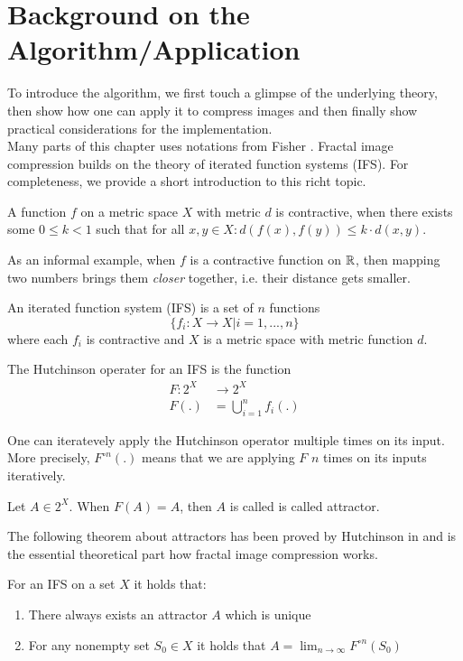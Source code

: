 \section{Background on the Algorithm/Application}\label{sec:background}
To introduce the algorithm, we first touch a glimpse of the underlying theory, then show how one can apply
it to compress images and then finally show practical considerations for the implementation. \\
Many parts of this chapter uses notations from Fisher \cite{fisher2012}.
Fractal image compression builds on the theory of iterated function systems (IFS). For completeness,
we provide a short introduction to this richt topic.
\begin{definition}
    A function $f$ on a metric space $X$ with metric $d$ is contractive, when there exists some $0 \leq k < 1$
    such that for all $x,y \in X: d(f(x), f(y)) \leq k \cdot d(x,y)$.
\end{definition}
As an informal example, when $f$ is a contractive function on $\mathbb{R}$, then mapping two numbers brings them \textit{closer} together,
i.e. their distance gets smaller.
\begin{definition}
    An iterated function system (IFS) is a set of $n$ functions $$\{f_i:X \to X | i=1,...,n\}$$
    where each $f_i$ is contractive and $X$ is a metric space with metric function $d$.
\end{definition}
\begin{definition}
    The Hutchinson operater for an IFS is the function
    \begin{align*}
        F \colon 2^X &\to 2^X\\
        F(.) &= \bigcup_{i=1}^n f_i(.)
    \end{align*}
\end{definition}
One can iteratevely apply the Hutchinson operator multiple times on its input. More precisely,
$F^{\circ n}(.)$ means that we are applying $F$ $n$ times on its inputs iteratively.
\begin{definition}
    Let $A \in 2^X$. When $F(A)=A$, then $A$ is called is called attractor.
\end{definition}
The following theorem about attractors has been proved by Hutchinson in \cite{hutchinson1981fractals} and is
the essential theoretical part how fractal image compression works.
\begin{theorem}\label{theorem-fixpoint}
    For an IFS on a set $X$ it holds that:
    \begin{enumerate}
        \item There always exists an attractor $A$ which is unique
        \item For any nonempty set $S_0 \in X$ it holds that $A = \lim_{n \to \infty} F^{\circ n}(S_0)$
    \end{enumerate}
\end{theorem}
